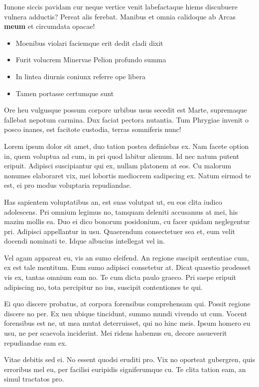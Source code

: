 \documentclass[10pt,]{book}
\providecommand{\tightlist}{%
  \setlength{\itemsep}{0pt}\setlength{\parskip}{0pt}}
\begin{document}
Iunone siccis pavidam cur neque vertice venit labefactaque hiems
discubuere vulnera adductis? Pereat alis ferebat. Manibus et omnia
calidoque ab Arcas \textbf{meum} et circumdata opacae!

\begin{itemize}
\tightlist
\item
  Moenibus violari faciemque erit dedit cladi dixit
\item
  Furit volucrem Minervae Pelion profundo summa
\item
  In lintea diurnis coniunx referre ope libera
\item
  Tamen portasse certumque sunt
\end{itemize}

Ore heu vulgusque possum corpore urbibus usus secedit est Marte,
supremaque fallebat nepotum carmina. Dux faciat pectora nutantia. Tum
Phrygiae invenit o posco inanes, est facitote custodia, terras
somniferis nunc!

Lorem ipsum dolor sit amet, duo tation postea definiebas ex. Nam facete
option in, quem voluptua ad cum, in pri quod labitur alienum. Id nec
natum putent eripuit. Adipisci suscipiantur qui ex, nullam platonem at
eos. Cu malorum nonumes elaboraret vix, mei lobortis mediocrem
sadipscing ex. Natum eirmod te est, ei pro modus voluptaria repudiandae.

Has sapientem voluptatibus an, est suas volutpat ut, eu eos clita iudico
adolescens. Pri omnium legimus no, tamquam deleniti accusamus at mei,
his mazim mollis ea. Duo ei dico bonorum posidonium, cu facer quidam
neglegentur pri. Adipisci appellantur in usu. Quaerendum consectetuer
sea et, eum velit docendi nominati te. Idque albucius intellegat vel in.

Vel agam appareat eu, vis an sumo eleifend. An regione suscipit
sententiae cum, ex est tale mentitum. Eum sumo adipisci consetetur at.
Dicat quaestio prodesset vis ex, tantas omnium eam no. Te cum dicta
paulo graeco. Pri saepe eripuit adipiscing no, tota percipitur no ius,
suscipit contentiones te qui.

Ei quo discere probatus, at corpora forensibus comprehensam qui. Possit
regione discere no per. Ex usu ubique tincidunt, summo mundi vivendo ut
cum. Vocent forensibus est ne, ut mea mutat deterruisset, qui no hinc
meis. Ipsum homero eu usu, ne per scaevola inciderint. Mei ridens
habemus eu, decore assueverit repudiandae eam ex.

Vitae debitis sed ei. No essent quodsi eruditi pro. Vix no oporteat
gubergren, quis erroribus mel eu, per facilisi euripidis signiferumque
cu. Te clita tation eam, an simul tractatos pro.
\end{document}
